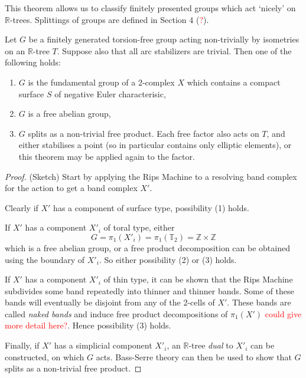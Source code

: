 This theorem allows us to classify finitely presented groups which act `nicely' on $\mathbb{R}$-trees. Splittings of groups are defined in Section 4 (\textcolor{red}{?}).
\begin{theorem}\label{rtreesclassification}
    Let $G$ be a finitely generated torsion-free group acting non-trivially by isometries on an $\mathbb{R}$-tree $T$. Suppose also that all arc stabilizers are trivial. Then one of the following holds:
    \begin{enumerate}
        \item $G$ is the fundamental group of a 2-complex $X$ which contains a compact surface $S$ of negative Euler characterisic,
        \item $G$ is a free abelian group,
        \item $G$ splits as a non-trivial free product. Each free factor also acts on $T$, and either stabilises a point (so in particular contains only elliptic elements), or this theorem may be applied again to the factor.
    \end{enumerate}
\end{theorem}
\begin{proof} (Sketch)
    Start by applying the Rips Machine to a resolving band complex for the action to get a band complex $X'$. 

    Clearly if $X'$ has a component of surface type, possibility (1) holds.

    If $X'$ has a component $X'_i$ of toral type, either \[G=\pi_1(X'_i)=\pi_1(\mathbb{T}_2)=\mathbb{Z}\times\mathbb{Z}\] which is a free abelian group, or a free product decomposition can be obtained using the boundary of $X'_i$. So either possibility (2) or (3) holds. 

    If $X'$ has a component $X'_i$ of thin type, it can be shown that the Rips Machine subdivides some band repeatedly into thinner and thinner bands. Some of these bands will eventually be disjoint from any of the 2-cells of $X'$. These bands are called \textit{naked bands} and induce free product decompositions of $\pi_1(X')$ \textcolor{red}{could give more detail here?}. Hence possibility (3) holds.

    Finally, if $X'$ has a simplicial component $X'_i$, an $\mathbb{R}$-tree \textit{dual} to $X'_i$ can be constructed, on which $G$ acts. Bass-Serre theory can then be used to show that $G$ splits as a non-trivial free product.
\end{proof}

